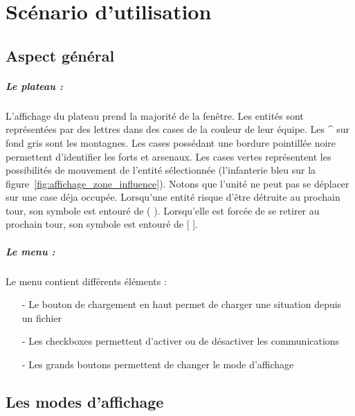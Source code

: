 \chapter{Scénario d'utilisation}

	\section{Aspect général}

		\paragraph{Le plateau :}
			L'affichage du plateau prend la majorité de la fenêtre.
			Les entités sont représentées par des lettres dans des cases de la couleur de leur équipe.
			Les \^{} sur fond gris sont les montagnes.
			Les cases possédant une bordure pointillée noire permettent d'identifier les forts et arsenaux.
			Les cases vertes représentent les possibilités de mouvement	de l'entité sélectionnée (l'infanterie bleu sur la figure~\ref{fig:affichage_zone_influence}). 
			Notons que l'unité ne peut pas se déplacer sur une case déja occupée.
			Lorsqu'une entité risque d'être détruite au prochain tour, son symbole est entouré de ( ).
			Lorsqu'elle est forcée de se retirer au prochain tour, son symbole est entouré de [ ].
	
		\paragraph{Le menu :}
	
			Le menu contient différents éléments :
			\begin{itemize}
			\item[-]Le bouton de chargement en haut permet de charger une situation depuis un fichier
			\item[-]Les checkboxes permettent d'activer ou de désactiver les communications
			\item[-]Les grands boutons permettent de changer le mode d'affichage
			\end{itemize}

	\section{Les modes d'affichage}

